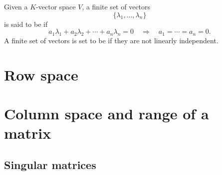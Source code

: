 \documentclass{ximera}
\begin{document}
\begin{definition}
  Given a $K$-vector space $V$, a finite set of vectors
  \[
  \{\lambda_1,\dots,\lambda_n\}
  \]
  is said to be  if
  \[
  a_1\lambda_1 + a_2\lambda_2 +\cdots + a_n\lambda_n = 0\quad \Rightarrow \quad a_1= \cdots =a_n = 0.
  \]
  A finite set of vectors is set to be  if
  they are not linearly independent.
\end{definition}



\section{Row space}

\section{Column space and range of a matrix}

\subsection{Singular matrices}
\end{document}
